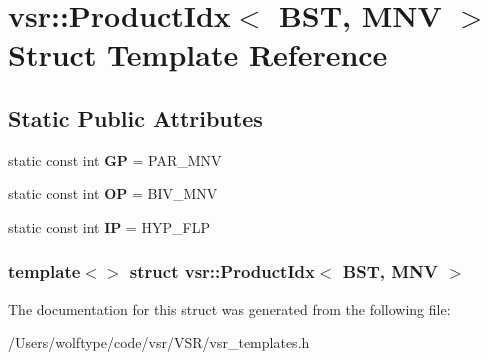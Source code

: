 \hypertarget{structvsr_1_1_product_idx_3_01_b_s_t_00_01_m_n_v_01_4}{\section{vsr\-:\-:Product\-Idx$<$ B\-S\-T, M\-N\-V $>$ Struct Template Reference}
\label{structvsr_1_1_product_idx_3_01_b_s_t_00_01_m_n_v_01_4}
}
\subsection*{Static Public Attributes}
\begin{DoxyCompactItemize}
\item 
\hypertarget{structvsr_1_1_product_idx_3_01_b_s_t_00_01_m_n_v_01_4_ad9dc3625027fb26cf9527a78b48bf077}{static const int {\bfseries G\-P} = P\-A\-R\-\_\-\-M\-N\-V}\label{structvsr_1_1_product_idx_3_01_b_s_t_00_01_m_n_v_01_4_ad9dc3625027fb26cf9527a78b48bf077}

\item 
\hypertarget{structvsr_1_1_product_idx_3_01_b_s_t_00_01_m_n_v_01_4_aff8c256de42b5614bd979b124514962d}{static const int {\bfseries O\-P} = B\-I\-V\-\_\-\-M\-N\-V}\label{structvsr_1_1_product_idx_3_01_b_s_t_00_01_m_n_v_01_4_aff8c256de42b5614bd979b124514962d}

\item 
\hypertarget{structvsr_1_1_product_idx_3_01_b_s_t_00_01_m_n_v_01_4_ab616d64dc9b14a3bf0974b8908d1e4d5}{static const int {\bfseries I\-P} = H\-Y\-P\-\_\-\-F\-L\-P}\label{structvsr_1_1_product_idx_3_01_b_s_t_00_01_m_n_v_01_4_ab616d64dc9b14a3bf0974b8908d1e4d5}

\end{DoxyCompactItemize}
\subsubsection*{template$<$$>$ struct vsr\-::\-Product\-Idx$<$ B\-S\-T, M\-N\-V $>$}



The documentation for this struct was generated from the following file\-:\begin{DoxyCompactItemize}
\item 
/\-Users/wolftype/code/vsr/\-V\-S\-R/vsr\-\_\-templates.\-h\end{DoxyCompactItemize}
